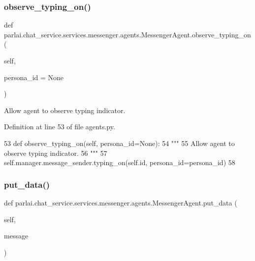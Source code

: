 \subsubsection{\texorpdfstring{observe\+\_\+typing\+\_\+on()}{observe\_typing\_on()}}
{\footnotesize\ttfamily def parlai.\+chat\+\_\+service.\+services.\+messenger.\+agents.\+Messenger\+Agent.\+observe\+\_\+typing\+\_\+on (\begin{DoxyParamCaption}\item[{}]{self,  }\item[{}]{persona\+\_\+id = {\ttfamily None} }\end{DoxyParamCaption})}

\begin{DoxyVerb}Allow agent to observe typing indicator.
\end{DoxyVerb}
 

Definition at line 53 of file agents.\+py.


\begin{DoxyCode}
53     \textcolor{keyword}{def }observe\_typing\_on(self, persona\_id=None):
54         \textcolor{stringliteral}{"""}
55 \textcolor{stringliteral}{        Allow agent to observe typing indicator.}
56 \textcolor{stringliteral}{        """}
57         self.manager.message\_sender.typing\_on(self.id, persona\_id=persona\_id)
58 
\end{DoxyCode}
\mbox{\label{classparlai_1_1chat__service_1_1services_1_1messenger_1_1agents_1_1MessengerAgent_a4a050f12b4223f41e1d499c3cb334ca7}} 
\subsubsection{\texorpdfstring{put\+\_\+data()}{put\_data()}}
{\footnotesize\ttfamily def parlai.\+chat\+\_\+service.\+services.\+messenger.\+agents.\+Messenger\+Agent.\+put\+\_\+data (\begin{DoxyParamCaption}\item[{}]{self,  }\item[{}]{message }\end{DoxyParamCaption})}


